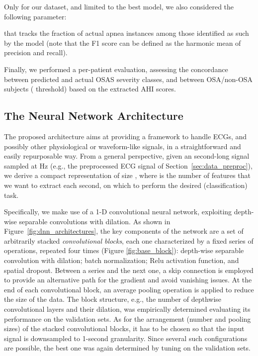 \documentclass[5p,twocolumn,lefttitle]{elsarticle}
\begin{document}
Only for our dataset, and limited to the best model, we also considered the following parameter:

that tracks the fraction of actual apnea instances among those identified as such by the model (note that the F1 score can be defined as the harmonic mean of precision and recall). 

Finally, we performed a per-patient evaluation, assessing the concordance between predicted and actual OSAS severity classes, and between OSA/non-OSA subjects ( threshold) based on the extracted AHI scores.




\subsection{The Neural Network Architecture}


The proposed architecture aims at providing a framework to handle ECGs, and possibly other physiological or waveform-like signals, in a straightforward and easily repurposable way. From a general perspective,
given an  second-long signal sampled at  Hz (e.g., the preprocessed ECG signal of Section~\ref{sec:data_preproc}), we derive a compact representation of size , where  is the number of features that we want to extract each second, on which to perform the desired (classification) task. 

Specifically, we make use of a \mbox{1-D} convolutional neural network, exploiting depth-wise separable convolutions with dilation. 
As shown in Figure~\ref{fig:dnn_architectures}, the key components of the network are a set of arbitrarily stacked \emph{convolutional blocks}, each one characterized by a fixed series of operations, repeated four times (Figure \ref{fig:base_block}):  depth-wise separable convolution with dilation;   batch normalization;  Relu activation function, and  spatial dropout. Between a series and the next one, a skip connection is employed to provide an alternative path for the gradient and avoid vanishing issues. At the end of each convolutional block, an average pooling operation is applied to reduce the size of the data. The block structure, e.g., the number of depthwise convolutional layers and their dilation, was empirically determined evaluating its performance on the validation sets. 
As for the arrangement (number and pooling sizes) of the stacked convolutional blocks, it has to be chosen so that the input signal is downsampled to 1-second granularity. Since several such configurations are possible, the best one was again determined by tuning on the validation sets.
\end{document}
